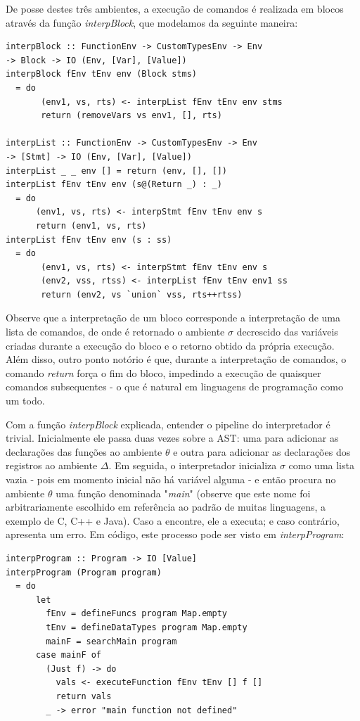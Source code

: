 \documentclass{article}
\begin{document}
De posse destes três ambientes, a execução de comandos é realizada em blocos através da função \textit{interpBlock}, que modelamos da seguinte maneira:

\begin{verbatim}
interpBlock :: FunctionEnv -> CustomTypesEnv -> Env 
-> Block -> IO (Env, [Var], [Value])
interpBlock fEnv tEnv env (Block stms)
  = do
       (env1, vs, rts) <- interpList fEnv tEnv env stms
       return (removeVars vs env1, [], rts)

interpList :: FunctionEnv -> CustomTypesEnv -> Env 
-> [Stmt] -> IO (Env, [Var], [Value])
interpList _ _ env [] = return (env, [], [])
interpList fEnv tEnv env (s@(Return _) : _)
  = do
      (env1, vs, rts) <- interpStmt fEnv tEnv env s
      return (env1, vs, rts)
interpList fEnv tEnv env (s : ss)
  = do
       (env1, vs, rts) <- interpStmt fEnv tEnv env s
       (env2, vss, rtss) <- interpList fEnv tEnv env1 ss
       return (env2, vs `union` vss, rts++rtss)
\end{verbatim}

Observe que a interpretação de um bloco corresponde a interpretação de uma lista de comandos, de onde é retornado o ambiente $\sigma$ decrescido das variáveis criadas durante a execução do bloco e o retorno obtido da própria execução. Além disso, outro ponto notório é que, durante a interpretação de comandos, o comando \textit{return} força o fim do bloco, impedindo a execução de quaisquer comandos subsequentes - o que é natural em linguagens de programação como um todo. 

Com a função \textit{interpBlock} explicada, entender o pipeline do interpretador é trivial. Inicialmente ele passa duas vezes sobre a AST: uma para adicionar as declarações das funções ao ambiente $\theta$ e outra para adicionar as declarações dos registros ao ambiente $\Delta$. Em seguida, o interpretador inicializa $\sigma$ como uma lista vazia - pois em momento inicial não há variável alguma - e então procura no ambiente $\theta$ uma função denominada "\textit{main}" (observe que este nome foi arbitrariamente escolhido em referência ao padrão de muitas linguagens, a exemplo de C, C++ e Java). Caso a encontre, ele a executa; e caso contrário, apresenta um erro. Em código, este processo pode ser visto em \textit{interpProgram}:

\begin{verbatim}
interpProgram :: Program -> IO [Value]
interpProgram (Program program)
  = do
      let
        fEnv = defineFuncs program Map.empty
        tEnv = defineDataTypes program Map.empty
        mainF = searchMain program
      case mainF of
        (Just f) -> do
          vals <- executeFunction fEnv tEnv [] f []
          return vals
        _ -> error "main function not defined"
\end{verbatim}
\end{document}
